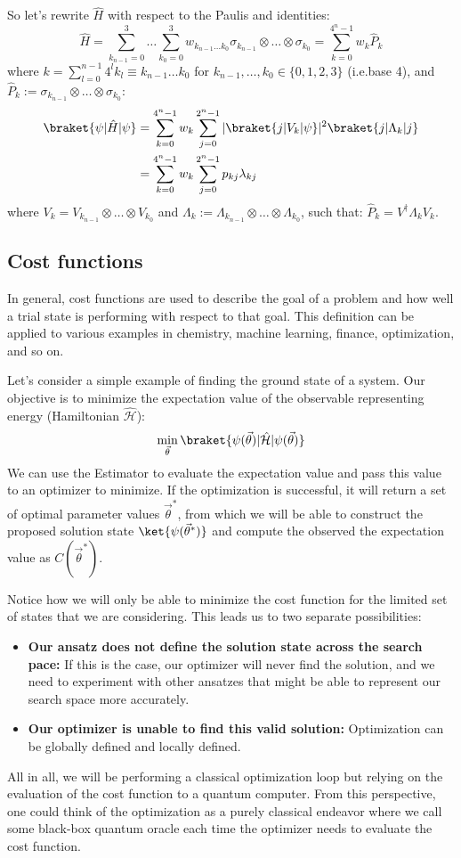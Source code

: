 \documentclass[12pt, oneside]{book}
\theoremstyle{definition}
\theoremstyle{definition}
\theoremstyle{remark}
\begin{document}
So let's rewrite $\hat{H}$ with respect to the Paulis and identities:
\[
\hat{H}=\sum_{k_{n-1}=0}^3 \ldots \sum_{k_{0}=0}^3 w_{k_{n-1}\ldots k_0} \sigma_{k_{n-1}} \otimes \ldots \otimes \sigma_{k_0} = \sum_{k=0}^{4^n-1}w_k\hat{P}_k
\]
where $k=\sum_{l=0}^{n-1}4^lk_l\equiv k_{n-1}\ldots k_0$ for $k_{n-1},\ldots, k_0 \in \{0,1,2,3\}$ (i.e.base 4), and $\hat{P}_k:=\sigma_{k_{n-1}}\otimes \ldots \otimes \sigma_{k_0}$:
\begin{align*}
\braket{\psi|\hat{H}|\psi}&=\sum_{k=0}^{4^n-1}w_k\sum_{j=0}^{2^n-1} |\braket{j|V_k|\psi}|^2 \braket{j|\Lambda_k|j}\\
&=\sum_{k=0}^{4^n-1}w_k\sum_{j=0}^{2^n-1}p_{kj}\lambda_{kj}
\end{align*}
where $V_k=V_{k_{n-1}} \otimes \ldots \otimes V_{k_0}$ and $\Lambda_k:=\Lambda_{k_{n-1}} \otimes \ldots \otimes \Lambda_{k_0}$, such that: $\hat{P}_k=V^{\dagger}\Lambda_kV_k$.

\subsection{Cost functions}
In general, cost functions are used to describe the goal of a problem and how well a trial state is performing with respect to that goal. This definition can be applied to various examples in chemistry, machine learning, finance, optimization, and so on.

Let's consider a simple example of finding the ground state of a system. Our objective is to minimize the expectation value of the observable representing energy (Hamiltonian $\hat{\mathcal{H}}$):
\[
\min_{\vec{\theta}} \braket{\psi(\vec{\theta})|\hat{\mathcal{H}}|\psi(\vec{\theta})}
\]
We can use the Estimator to evaluate the expectation value and pass this value to an optimizer to minimize. If the optimization is successful, it will return a set of optimal parameter values $\vec{\theta}^*$, from which we will be able to construct the proposed solution state $\ket{\psi(\vec{\theta}^*)}$ and compute the observed the expectation value as $C(\vec{\theta}^*)$.

Notice how we will only be able to minimize the cost function for the limited set of states that we are considering. This leads us to two separate possibilities:
\begin{itemize}
    \item \textbf{Our ansatz does not define the solution state across the search pace: } If this is the case, our optimizer will never find the solution, and we need to experiment with other ansatzes that might be able to represent our search space more accurately.
    \item \textbf{Our optimizer is unable to find this valid solution: }Optimization can be globally defined and locally defined.
\end{itemize}
All in all, we will be performing a classical optimization loop but relying on the evaluation of the cost function to a quantum computer. From this perspective, one could think of the optimization as a purely classical endeavor where we call some black-box quantum oracle each time the optimizer needs to evaluate the cost function.
\end{document}
